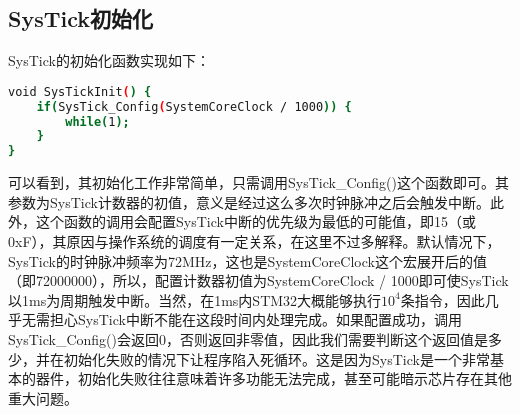 	\subsection{SysTick初始化}
	SysTick的初始化函数实现如下：
	\par 
	\begin{lstlisting}[language=bash, style=customStyleC, caption=SysTickInit函数]
void SysTickInit() {
	if(SysTick_Config(SystemCoreClock / 1000)) {
		while(1);
	}
}
	\end{lstlisting}
	\par 
	可以看到，其初始化工作非常简单，只需调用SysTick\_Config()这个函数即可。其参数为SysTick计数器的初值，意义是经过这么多次时钟脉冲之后会触发中断。此外，这个函数的调用会配置SysTick中断的优先级为最低的可能值，即15（或0xF），其原因与操作系统的调度有一定关系，在这里不过多解释。默认情况下，SysTick的时钟脉冲频率为72MHz，这也是SystemCoreClock这个宏展开后的值（即72000000），所以，配置计数器初值为SystemCoreClock / 1000即可使SysTick以1ms为周期触发中断。当然，在1ms内STM32大概能够执行$10^4$条指令，因此几乎无需担心SysTick中断不能在这段时间内处理完成。如果配置成功，调用SysTick\_Config()会返回0，否则返回非零值，因此我们需要判断这个返回值是多少，并在初始化失败的情况下让程序陷入死循环。这是因为SysTick是一个非常基本的器件，初始化失败往往意味着许多功能无法完成，甚至可能暗示芯片存在其他重大问题。
	
